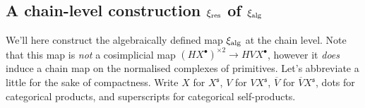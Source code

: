 \documentclass[11pt]{amsart}
\theoremstyle{plain}
\theoremstyle{definition}
\newcommand{\DASH}{\textup{--}}
\renewcommand{\to}{\longrightarrow}
\newcommand{\fraks}{\mathfrak{s}}
\theoremstyle{plain}
\begin{document}
\begin{Operations on the Bousfield-Kan spectral sequence}
\subsection{A chain-level construction $\xi_\textup{res}$ of $\xi_\textup{alg}$}
We'll here construct the algebraically defined map $\xi_\textup{alg}$ at the chain level. Note that this map is \emph{not} a cosimplicial map $(HX^\bullet)^{\times2}\to HVX^\bullet$, however it \emph{does} induce a chain map on the normalised complexes of primitives.
Let's abbreviate a little for the sake of compactness. Write $X$ for $X^\fraks$, $V$ for $VX^\fraks$, $\overline{V}$ for $\overline{V}X^\fraks$, dots for categorical products, and superscripts for categorical self-products.

\end{Operations on the Bousfield-Kan spectral sequence}
\end{document}
